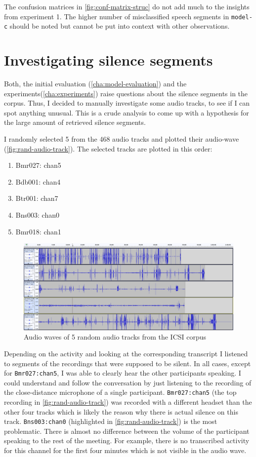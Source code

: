 \documentclass[bsc,frontabs,parskip,deptreport]{infthesis}
\begin{document}
The confusion matrices in \autoref{fig:conf-matrix-struc} do not add much to the insights from experiment 1. The higher number of misclassified speech segments in \texttt{model-c} should be noted but cannot be put into context with other observations.


\section{Investigating silence segments}
Both, the initial evaluation (\autoref{cha:model-evaluation}) and the experiments(\autoref{cha:experiments}) raise questions about the silence segments in the corpus. Thus, I decided to manually investigate some audio tracks, to see if I can spot anything unusual. This is a crude analysis to come up with a hypothesis for the large amount of retrieved silence segments.

I randomly selected 5 from the 468 audio tracks and plotted their audio-wave (\autoref{fig:rand-audio-track}). The selected tracks are plotted in this order:
\begin{enumerate}
    \item Bmr027: chan5
    \item Bdb001: chan4
    \item Btr001: chan7
    \item Bns003: chan0
    \item Bmr018: chan1
\end{enumerate}

\begin{figure}[h!]
    \centering
    \includegraphics[width=14cm]{imgs/plotted_audio_waves.png}
    \caption{Audio waves of 5 random audio tracks from the ICSI corpus}
    \label{fig:rand-audio-track}
\end{figure}
Depending on the activity and looking at the corresponding transcript I listened to segments of the recordings that were supposed to be silent. In all cases, except for \verb|Bmr027:chan5|, I was able to clearly hear the other participants speaking. I could understand and follow the conversation by just listening to the recording of the close-distance microphone of a single participant. 
\verb|Bmr027:chan5| (the top recording in \autoref{fig:rand-audio-track}) was recorded with a different headset than the other four tracks which is likely the reason why there is actual silence on this track.
\verb|Bns003:chan0| (highlighted in \autoref{fig:rand-audio-track}) is the most problematic. There is almost no difference between the volume of the participant speaking to the rest of the meeting. For example, there is no transcribed activity for this channel for the first four minutes which is not visible in the audio wave.
\end{document}
